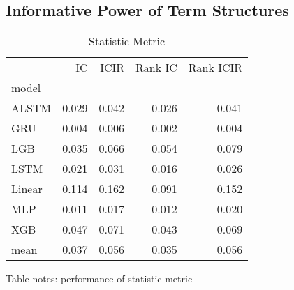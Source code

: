 \documentclass[10pt,letterpaper]{article}
\begin{document}
\subsection*{Informative Power of Term Structures}
\begin{table}[!ht]
\centering
\caption{Statistic Metric}
\begin{tabular}{lrrrr}
\toprule
{} &     IC &   ICIR &  Rank IC &  Rank ICIR \\
model  &        &        &          &            \\
\midrule
ALSTM  &  0.029 &  0.042 &    0.026 &      0.041 \\
GRU    &  0.004 &  0.006 &    0.002 &      0.004 \\
LGB    &  0.035 &  0.066 &    0.054 &      0.079 \\
LSTM   &  0.021 &  0.031 &    0.016 &      0.026 \\
Linear &  0.114 &  0.162 &    0.091 &      0.152 \\
MLP    &  0.011 &  0.017 &    0.012 &      0.020 \\
XGB    &  0.047 &  0.071 &    0.043 &      0.069 \\
mean   &  0.037 &  0.056 &    0.035 &      0.056 \\
\bottomrule
\end{tabular}




\begin{flushleft}
Table notes: performance of statistic metric
\end{flushleft}
\label{table1}

\end{table}
\end{document}
